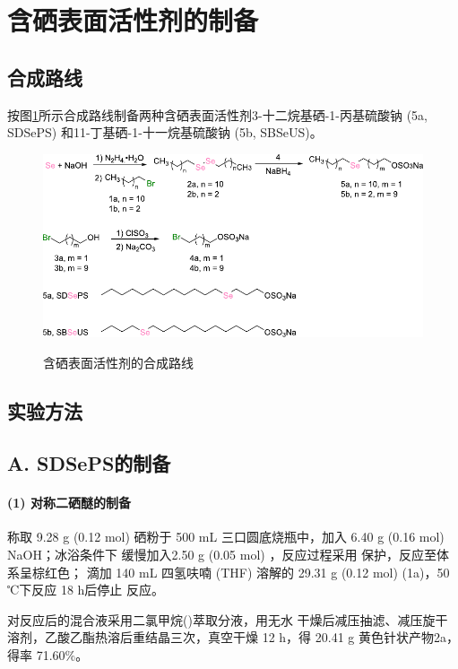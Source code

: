 \documentclass[bachelor,winfonts,replaceperiod]{jnuthesis}
\begin{document}
    \section{含硒表面活性剂的制备}
    \subsection{合成路线}
    按图\ref{fig:scheme-synthesis}所示合成路线制备两种含硒表面活性剂3-十二烷基硒-1-丙基硫酸钠 
    (5a, SDSePS) 和11-丁基硒-1-十一烷基硫酸钠 (5b, SBSeUS)。
    \begin{figure}[htbp]
        \centering
        \includegraphics[scale=1]{figure/scheme-synthesis.pdf}\\
        \caption{含硒表面活性剂的合成路线}\label{fig:scheme-synthesis}
    \end{figure}

    \subsection{实验方法}
    \subsection*{A. SDSePS的制备}
    \paragraph*{(1) 对称二硒醚的制备}
    称取 9.28 g (0.12 mol) 硒粉于 500 mL 三口圆底烧瓶中，加入 6.40 g (0.16 mol) NaOH；冰浴条件下
    缓慢加入2.50 g (0.05 mol) ，反应过程采用 保护，反应至体系呈棕红色； 
    滴加 140 mL 四氢呋喃 (THF) 溶解的 29.31 g (0.12 mol)  (1a)，50 ℃下反应 18 h后停止
    反应。
    
    对反应后的混合液采用二氯甲烷()萃取分液，用无水 干燥后减压抽滤、减压旋干
    溶剂，乙酸乙酯热溶后重结晶三次，真空干燥 12 h，得 20.41 g 黄色针状产物2a，得率 71.60\%。
    
\end{document}
